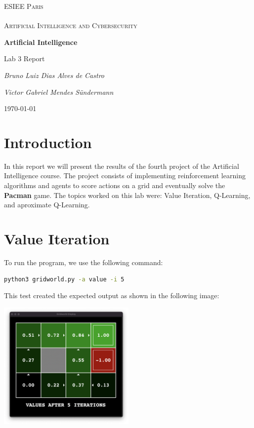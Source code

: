 \documentclass{article}
\begin{document}
\begin{titlepage}
\centering
{\textsc{\Large ESIEE Paris \\ ~\\ Artificial Intelligence and Cybersecurity} \par}
\vfill
{\huge\bfseries Artificial Intelligence \par}
\vspace{0.5cm}
{\LARGE Lab 3 Report \par}
\vspace{2cm}
{\Large\itshape Bruno Luiz Dias Alves de Castro \par}
{\Large\itshape Victor Gabriel Mendes Sündermann \par}
\vfill

{\large \today\par}
\end{titlepage}

\pagebreak
\tableofcontents
\pagebreak

\section{Introduction}

In this report we will present the results of the fourth project of the Artificial Intelligence course. The project consists of implementing reinforcement learning algorithms and agents to score actions on a grid and eventually solve the \textbf{Pacman} game.
The topics worked on this lab were: Value Iteration, Q-Learning, and aproximate Q-Learning.

\section{Value Iteration}
To run the program, we use the following command:

\hbox{}

\begin{lstlisting}[language=bash, frame=tlbr, framesep=6pt, backgroundcolor=\color{light-gray}]
  python3 gridworld.py -a value -i 5
\end{lstlisting}

\hbox{}

This test created the expected output as shown in the following image:

\hbox{}
\includegraphics[width=0.5\textwidth]{images/gridWorld-ex2.png}
\hbox{}
\end{document}
